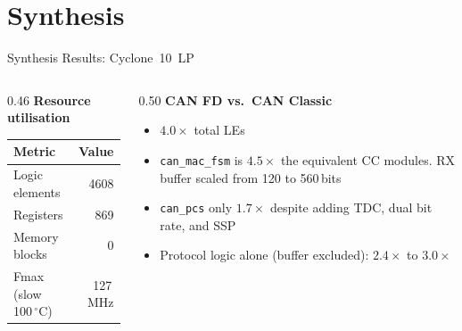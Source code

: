 \documentclass[aspectratio=169,hyperref={pdfpagelabels=false}]{beamer}
\begin{document}
\section{Synthesis}
\begin{frame}{Synthesis Results: Cyclone~10~LP}
	\begin{columns}[T]
		\begin{column}{0.46\textwidth}
			\textbf{Resource utilisation}\\[0.4em]
			\renewcommand{\arraystretch}{1.3}
			\begin{tabular}{lr}
				\toprule
				Metric                     & Value    \\
				\midrule
				Logic elements             & 4608     \\
				Registers                  & 869      \\
				Memory blocks              & 0        \\
				Fmax (slow 100\,$^\circ$C) & 127\,MHz \\
				\bottomrule
			\end{tabular}
		\end{column}
		\begin{column}{0.50\textwidth}
			\textbf{CAN FD vs.\ CAN Classic}\\[0.4em]
			\begin{itemize}
				\item $4.0\times$ total LEs
				\item \texttt{can\_mac\_fsm} is $4.5\times$ the equivalent CC modules. RX buffer scaled from 120 to 560\,bits
				\item \texttt{can\_pcs} only $1.7\times$ despite adding TDC, dual bit rate, and SSP
				\item Protocol logic alone (buffer excluded): $2.4\times$ to $3.0\times$
			\end{itemize}
		\end{column}
	\end{columns}
\end{frame}
\end{document}
